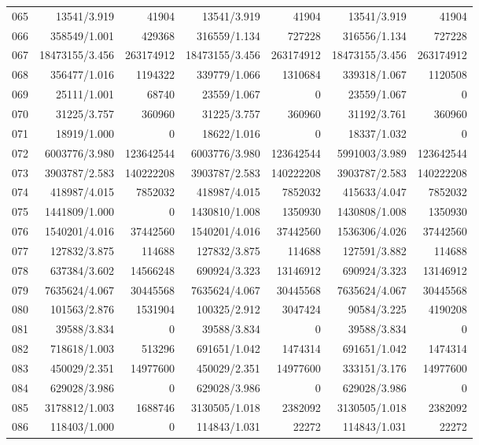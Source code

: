 \begin{longtable}{crrrrrr}
065 & 13541/3.919 & 41904 & 13541/3.919 & 41904 & 13541/3.919 & 41904 \\
066 & 358549/1.001 & 429368 & 316559/1.134 & 727228 & 316556/1.134 & 727228 \\
067 & 18473155/3.456 & 263174912 & 18473155/3.456 & 263174912 & 18473155/3.456 & 263174912 \\
068 & 356477/1.016 & 1194322 & 339779/1.066 & 1310684 & 339318/1.067 & 1120508 \\
069 & 25111/1.001 & 68740 & 23559/1.067 & 0 & 23559/1.067 & 0 \\
070 & 31225/3.757 & 360960 & 31225/3.757 & 360960 & 31192/3.761 & 360960 \\
071 & 18919/1.000 & 0 & 18622/1.016 & 0 & 18337/1.032 & 0 \\
072 & 6003776/3.980 & 123642544 & 6003776/3.980 & 123642544 & 5991003/3.989 & 123642544 \\
073 & 3903787/2.583 & 140222208 & 3903787/2.583 & 140222208 & 3903787/2.583 & 140222208 \\
074 & 418987/4.015 & 7852032 & 418987/4.015 & 7852032 & 415633/4.047 & 7852032 \\
075 & 1441809/1.000 & 0 & 1430810/1.008 & 1350930 & 1430808/1.008 & 1350930 \\
076 & 1540201/4.016 & 37442560 & 1540201/4.016 & 37442560 & 1536306/4.026 & 37442560 \\
077 & 127832/3.875 & 114688 & 127832/3.875 & 114688 & 127591/3.882 & 114688 \\
078 & 637384/3.602 & 14566248 & 690924/3.323 & 13146912 & 690924/3.323 & 13146912 \\
079 & 7635624/4.067 & 30445568 & 7635624/4.067 & 30445568 & 7635624/4.067 & 30445568 \\
080 & 101563/2.876 & 1531904 & 100325/2.912 & 3047424 & 90584/3.225 & 4190208 \\
081 & 39588/3.834 & 0 & 39588/3.834 & 0 & 39588/3.834 & 0 \\
082 & 718618/1.003 & 513296 & 691651/1.042 & 1474314 & 691651/1.042 & 1474314 \\
083 & 450029/2.351 & 14977600 & 450029/2.351 & 14977600 & 333151/3.176 & 14977600 \\
084 & 629028/3.986 & 0 & 629028/3.986 & 0 & 629028/3.986 & 0 \\
085 & 3178812/1.003 & 1688746 & 3130505/1.018 & 2382092 & 3130505/1.018 & 2382092 \\
086 & 118403/1.000 & 0 & 114843/1.031 & 22272 & 114843/1.031 & 22272 \\

\end{longtable}
